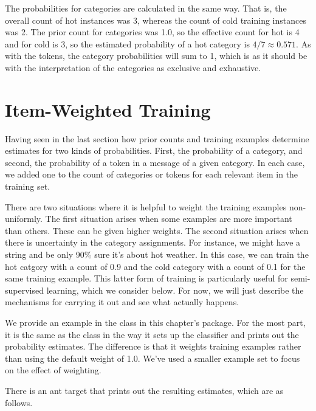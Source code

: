 The probabilities for categories are calculated in the same way.  That
is, the overall count of hot instances was 3, whereas the count of
cold training instances was 2.  The prior count for categories was
1.0, so the effective count for hot is 4 and for cold is 3, so the
estimated probability of a hot category is $4/7 \approx 0.571$.  As
with the tokens, the category probabilities will sum to 1, which is as
it should be with the interpretation of the categories as exclusive
and exhaustive.



\section{Item-Weighted Training}

Having seen in the last section how prior counts and training examples
determine estimates for two kinds of probabilities.  First, the probability
of a category, and second, the probability of a token in a message of
a given category.  In each case, we added one to the count of categories
or tokens for each relevant item in the training set.

There are two situations where it is helpful to weight the training
examples non-uniformly.  The first situation arises when some examples
are more important than others.  These can be given higher weights.
The second situation arises when there is uncertainty in the category
assignments.  For instance, we might have a string and be only 90\%
sure it's about hot weather.  In this case, we can train the hot
catgory with a count of 0.9 and the cold category with a count of 0.1
for the same training example.  This latter form of training is
particularly useful for semi-supervised learning, which we consider
below.  For now, we will just describe the mechanisms for carrying it
out and see what actually happens.

We provide an example in the class  in this
chapter's package.  For the most part, it is the same as the
 class in the way it sets up the classifier and
prints out the probability estimates.  The difference is that it weights
training examples rather than using the default weight of 1.0.
%
%
We've used a smaller example set to focus on the effect of weighting.

There is an ant target  that prints out the
resulting estimates, which are as follows.

